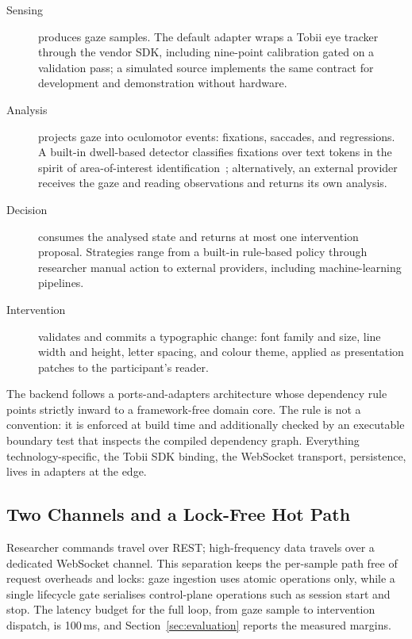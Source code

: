 \begin{description}
\item[Sensing] produces gaze samples.
The default adapter wraps a Tobii eye tracker through the vendor SDK, including nine-point calibration gated on a validation pass; a simulated source implements the same contract for development and demonstration without hardware.
\item[Analysis] projects gaze into oculomotor events: fixations, saccades, and regressions.
A built-in dwell-based detector classifies fixations over text tokens in the spirit of area-of-interest identification~\cite{salvucci2000identifying}; alternatively, an external provider receives the gaze and reading observations and returns its own analysis.
\item[Decision] consumes the analysed state and returns at most one intervention proposal.
Strategies range from a built-in rule-based policy through researcher manual action to external providers, including machine-learning pipelines.
\item[Intervention] validates and commits a typographic change: font family and size, line width and height, letter spacing, and colour theme, applied as presentation patches to the participant's reader.
\end{description}

The backend follows a ports-and-adapters architecture whose dependency rule points strictly inward to a framework-free domain core.
The rule is not a convention: it is enforced at build time and additionally checked by an executable boundary test that inspects the compiled dependency graph.
Everything technology-specific, the Tobii SDK binding, the WebSocket transport, persistence, lives in adapters at the edge.

\subsection{Two Channels and a Lock-Free Hot Path}

Researcher commands travel over REST; high-frequency data travels over a dedicated WebSocket channel.
This separation keeps the per-sample path free of request overheads and locks: gaze ingestion uses atomic operations only, while a single lifecycle gate serialises control-plane operations such as session start and stop.
The latency budget for the full loop, from gaze sample to intervention dispatch, is 100\,ms, and Section~\ref{sec:evaluation} reports the measured margins.

